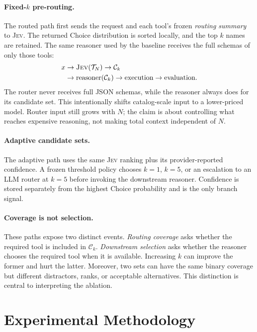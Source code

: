 \documentclass[10pt,twocolumn]{article}
\newcommand{\jev}{\textsc{Jev}}
\begin{document}
\paragraph{Fixed-$k$ pre-routing.}
The routed path first sends the request and each tool's frozen \emph{routing summary} to \jev{}. The returned Choice distribution is sorted locally, and the top $k$ names are retained. The same reasoner used by the baseline receives the full schemas of only those tools:
\begin{align*}
x &\rightarrow \jev{}(\mathcal{T}_N) \rightarrow \mathcal{C}_k\\
  &\rightarrow \text{reasoner}(\mathcal{C}_k) \rightarrow \text{execution}
  \rightarrow \text{evaluation}.
\end{align*}
The router never receives full JSON schemas, while the reasoner always does for its candidate set. This intentionally shifts catalog-scale input to a lower-priced model. Router input still grows with $N$; the claim is about controlling what reaches expensive reasoning, not making total context independent of $N$.

\paragraph{Adaptive candidate sets.}
The adaptive path uses the same \jev{} ranking plus its provider-reported confidence. A frozen threshold policy chooses $k=1$, $k=5$, or an escalation to an LLM router at $k=5$ before invoking the downstream reasoner. Confidence is stored separately from the highest Choice probability and is the only branch signal.

\paragraph{Coverage is not selection.}
These paths expose two distinct events. \emph{Routing coverage} asks whether the required tool is included in $\mathcal{C}_k$. \emph{Downstream selection} asks whether the reasoner chooses the required tool when it is available. Increasing $k$ can improve the former and hurt the latter. Moreover, two sets can have the same binary coverage but different distractors, ranks, or acceptable alternatives. This distinction is central to interpreting the ablation.

\section{Experimental Methodology}
\label{sec:method}
\end{document}
